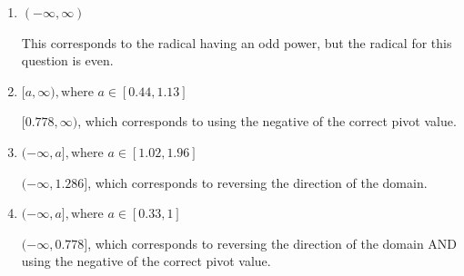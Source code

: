 \documentclass{extbook}[14pt]
\begin{document}
\begin{enumerate}
{\begin{enumerate}[label=\Alph*.]
* $[1.286, \infty)$, which is the correct option.
\item \( (-\infty, \infty) \)

This corresponds to the radical having an odd power, but the radical for this question is even.
\item \( [a, \infty), \text{where } a \in [0.44, 1.13] \)

$[0.778, \infty)$, which corresponds to using the negative of the correct pivot value.
\item \( (-\infty, a], \text{where } a \in [1.02, 1.96] \)

 $(-\infty, 1.286]$, which corresponds to reversing the direction of the domain.
\item \( (-\infty, a], \text{where } a \in [0.33, 1] \)

$(-\infty, 0.778]$, which corresponds to reversing the direction of the domain AND using the negative of the correct pivot value.
\end{enumerate}

}
\end{enumerate}
\end{document}
